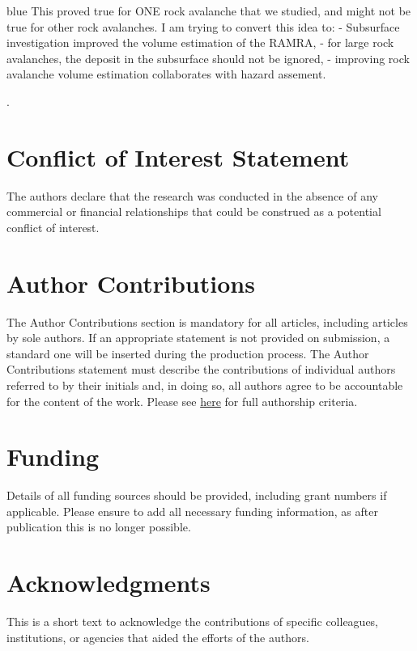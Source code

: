 \documentclass[utf8]{frontiersSCNS}
\newcommand{\COMON}{\begin{color}{blue}}
\newcommand{\COMOFF}{\end{color}}
\begin{document}
     \COMON 
     This proved true for ONE rock avalanche that we studied, and might not be true for other rock avalanches. I am trying to convert this idea to:
     - Subsurface investigation improved the volume estimation of the RAMRA,
     - for large rock avalanches, the deposit in the subsurface should not be ignored,
     - improving rock avalanche volume estimation collaborates with hazard assement. 
      \COMOFF. 



\section*{Conflict of Interest Statement}

The authors declare that the research was conducted in the absence of any commercial or financial relationships that could be construed as a potential conflict of interest.


\section*{Author Contributions}

The Author Contributions section is mandatory for all articles, including articles by sole authors. If an appropriate statement is not provided on submission, a standard one will be inserted during the production process. The Author Contributions statement must describe the contributions of individual authors referred to by their initials and, in doing so, all authors agree to be accountable for the content of the work. Please see  \href{http://home.frontiersin.org/about/author-guidelines#AuthorandContributors}{here} for full authorship criteria.


\section*{Funding}
Details of all funding sources should be provided, including grant numbers if applicable. Please ensure to add all necessary funding information, as after publication this is no longer possible.


\section*{Acknowledgments}
This is a short text to acknowledge the contributions of specific colleagues, institutions, or agencies that aided the efforts of the authors.
\end{document}
